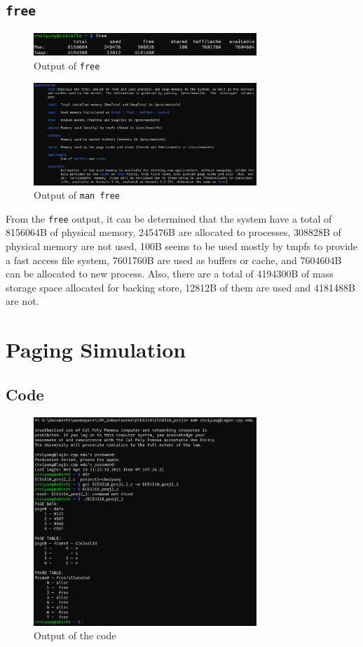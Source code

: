 \documentclass{article}
\begin{document}
\subsection{\texttt{free}}

\begin{figure}[H]

  \caption{Output of \texttt{free}}
  \centering
  \includegraphics[width=0.75\textwidth]{ECE4310_proj2_free.png}
\end{figure}

\begin{figure}[H]
  \caption{Output of \texttt{man free}}
  \centering
  \includegraphics[width=0.75\textwidth]{ECE4310_proj2_free_man.png}
\end{figure}

From the \texttt{free} output, it can be determined that the system have a total of 8156064B of physical memory, 
245476B are allocated to processes, 308828B of physical memory are not used, 100B seems to be used mostly by tmpfs to provide a fast access file system, 
7601760B are used as buffers or cache, and 7604604B can be allocated to new process. 
Also, there are a total of 4194300B of mass storage space allocated for backing store, 12812B of them are used and 4181488B are not.

\section{Paging Simulation}
\subsection*{Code}

\begin{figure}[H]

  \caption{Output of the code}
  \centering
  \includegraphics[width=0.75\textwidth]{ECE4310_proj2_2_abbott.png}
\end{figure}
\end{document}
